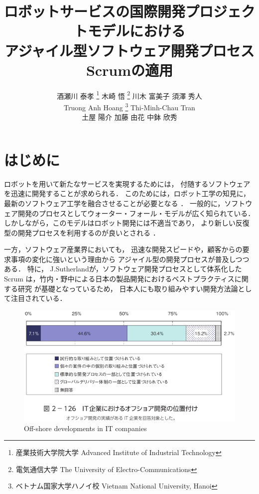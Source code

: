 \documentclass[a4j, 12Q, twocolumn, twoside]{jsarticle}
\title{ロボットサービスの国際開発プロジェクトモデルにおける\\
アジャイル型ソフトウェア開発プロセスScrumの適用}
\author{
  酒瀬川 泰孝
  \thanks{産業技術大学院大学 \newline
  Advanced Institute of Industrial Technology}
  木崎 悟
  \thanks{電気通信大学 \newline
  The University of Electro-Communications}
  川木 富美子
  \thanksmark[1]
  須澤 秀人
  \thanksmark[1]
  \\
  Truong Anh Hoang
  \thanks{ベトナム国家大学ハノイ校 \newline
  Vietnam National University, Hanoi}
  Thi-Minh-Chau Tran
  \thanksmark[3]
  \\
  土屋 陽介
  \thanksmark[1]
  加藤 由花
  \thanksmark[1]
  中鉢 欣秀
  \thanksmark[1]
}
\begin{document}
\amaketitle[-1pt]

\section{はじめに}

ロボットを用いて新たなサービスを実現するためには，
付随するソフトウェアを迅速に開発することが求められる．
このためには，ロボット工学の知見に，最新のソフトウェア工学を融合させることが必要となる
\cite{pons2012systematic}
．
一般的に，ソフトウェア開発のプロセスとしてウォーター・フォール・モデルが広く知られている．
しかしながら，このモデルはロボット開発には不適当であり，
より新しい反復型の開発プロセスを利用するのが良いとされる
\cite{kaindl2009iterative}
．

一方，ソフトウェア産業界においても，
迅速な開発スピードや，顧客からの要求事項の変化に強いという理由から
アジャイル型の開発プロセスが普及しつつある．
特に，
J.Sutherlandが，ソフトウェア開発プロセスとして体系化したScrum
\cite{sutherland2008agile, sutherland2011scrum}
は，竹内・野中による日本の製品開発におけるベストプラクティスに関する研究
\cite{takeuchi1986new}
が基礎となっているため，
日本人にも取り組みやすい開発方法論として注目されている．

\begin{figure}
  \begin{center}
    \includegraphics[width=\columnwidth]{./figures/IT_Jinzai.png}
    \caption{Off-shore developments in IT companies}
    \label{fig:itjinzai}
  \end{center}
\end{figure}
\end{document}
